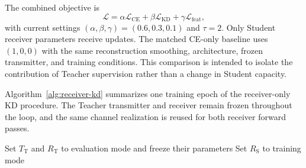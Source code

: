 \documentclass[conference]{IEEEtran}
\begin{document}
The combined objective is
\begin{equation}
 \mathcal{L}=\alpha\mathcal{L}_{\mathrm{CE}}+
 \beta\mathcal{L}_{\mathrm{KD}}+\gamma\mathcal{L}_{\mathrm{feat}},
\end{equation}
with current settings $(\alpha,\beta,\gamma)=(0.6,0.3,0.1)$ and $\tau=2$. Only Student receiver parameters receive updates. The matched CE-only baseline uses $(1,0,0)$ with the same reconstruction smoothing, architecture, frozen transmitter, and training conditions. This comparison is intended to isolate the contribution of Teacher supervision rather than a change in Student capacity.

Algorithm~\ref{alg:receiver-kd} summarizes one training epoch of the receiver-only KD procedure. The Teacher transmitter and receiver remain frozen throughout the loop, and the same channel realization is reused for both receiver forward passes.

\begin{algorithm}[t]
\caption{Receiver-Only Knowledge Distillation Training}
\label{alg:receiver-kd}
\small
{}
Set $T_{\mathrm{T}}$ and $R_{\mathrm{T}}$ to evaluation mode and freeze their parameters\;
Set $R_{\mathrm{S}}$ to training mode\;
\;
\end{algorithm}
\end{document}
